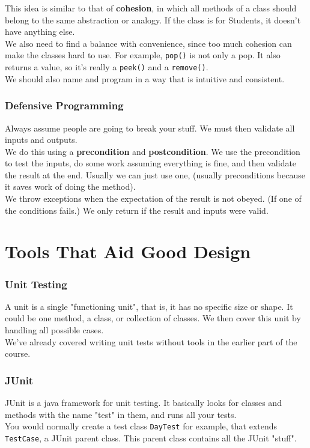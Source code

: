 \documentclass[12pt]{article}
\theoremstyle{definition}
\begin{document}
This idea is similar to that of \textbf{cohesion}, in which all methods of a class should belong to the same abstraction or analogy. If the class is for Students, it doesn't have anything else.
\\ \linebreak
We also need to find a balance with convenience, since too much cohesion can make the classes hard to use. For example, \texttt{pop()} is not only a pop. It also returns a value, so it's really a \texttt{peek()} and a \texttt{remove()}.
\\ \linebreak
We should also name and program in a way that is intuitive and consistent.

\section{Defensive Programming}
Always assume people are going to break your stuff. We must then validate all inputs and outputs.
\\ \linebreak
We do this using a \textbf{precondition} and \textbf{postcondition}. We use the precondition to test the inputs, do some work assuming everything is fine, and then validate the result at the end. Usually we can just use one, (usually preconditions because it saves work of doing the method).
\\ \linebreak
We throw exceptions when the expectation of the result is not obeyed. (If one of the conditions fails.) We only return if the result and inputs were valid. 

\part{Tools That Aid Good Design}
\section{Unit Testing}
A unit is a single "functioning unit", that is, it has no specific size or shape. It could be one method, a class, or collection of classes. We then cover this unit by handling all possible cases.
\\ \linebreak
We've already covered writing unit tests without tools in the earlier part of the course.
\\ \linebreak

\section{JUnit}
JUnit is a java framework for unit testing. It basically looks for classes and methods with the name "test" in them, and runs all your tests. 
\\ \linebreak
You would normally create a test class \texttt{DayTest} for example, that extends \texttt{TestCase}, a JUnit parent class. This parent class contains all the JUnit "stuff". 
\end{document}
